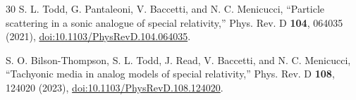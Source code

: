\documentclass[10pt,aps,onecolumn,floatfix,notitlepage,nofootinbib,showkeys]{revtex4-2}
\begin{document}
\begin{thebibliography}{30}
S. L. Todd, G. Pantaleoni, V. Baccetti, and N. C. Menicucci,
``Particle scattering in a sonic analogue of special relativity,''
Phys. Rev. D \textbf{104}, 064035 (2021),
\href{https://doi.org/10.1103/PhysRevD.104.064035}{doi:10.1103/PhysRevD.104.064035}.

S. O. Bilson-Thompson, S. L. Todd, J. Read, V. Baccetti, and N. C. Menicucci,
``Tachyonic media in analog models of special relativity,''
Phys. Rev. D \textbf{108}, 124020 (2023),
\href{https://doi.org/10.1103/PhysRevD.108.124020}{doi:10.1103/PhysRevD.108.124020}.

\end{thebibliography}
\end{document}

